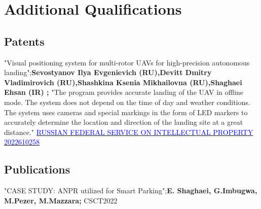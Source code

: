 \section{Additional Qualifications}

\renewcommand{\labelitemi}{o}
\subsection{\textbf{Patents}}
    {"Visual positioning system for multi-rotor UAVs for high-precision autonomous landing";\textbf{Sevostyanov Ilya Evgenievich (RU),Devitt Dmitry Vladimirovich (RU),Shashkina Ksenia Mikhailovna (RU),Shaghaei Ehsan (IR) ;} "The program provides accurate landing of the UAV in offline mode. The system does not depend on the time of day and weather conditions. The system uses cameras and special markings in the form of LED markers to accurately determine the location and direction of the landing site at a great distance."  \href{https://new.fips.ru/registers-doc-view/fips_servlet?DB=EVM&DocNumber=2022610258}{\textcolor{blue}{RUSSIAN FEDERAL SERVICE
ON INTELLECTUAL PROPERTY 2022610258} }}

\subsection{\textbf{Publications}}
	
    {"CASE STUDY: ANPR utilized for Smart Parking";\textbf{E. Shaghaei, G.Imbugwa, M.Pezer, M.Mazzara;} CSCT2022}
    
    

